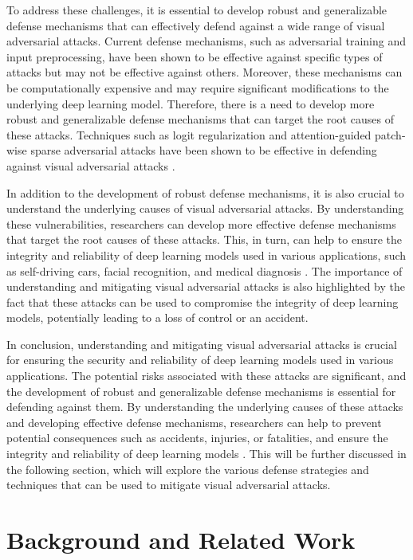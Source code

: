 \documentclass[11pt]{article}
\begin{document}
To address these challenges, it is essential to develop robust and generalizable defense mechanisms that can effectively defend against a wide range of visual adversarial attacks. Current defense mechanisms, such as adversarial training and input preprocessing, have been shown to be effective against specific types of attacks but may not be effective against others. Moreover, these mechanisms can be computationally expensive and may require significant modifications to the underlying deep learning model. Therefore, there is a need to develop more robust and generalizable defense mechanisms that can target the root causes of these attacks. Techniques such as logit regularization and attention-guided patch-wise sparse adversarial attacks have been shown to be effective in defending against visual adversarial attacks \cite{ref15} \cite{ref16}.

In addition to the development of robust defense mechanisms, it is also crucial to understand the underlying causes of visual adversarial attacks. By understanding these vulnerabilities, researchers can develop more effective defense mechanisms that target the root causes of these attacks. This, in turn, can help to ensure the integrity and reliability of deep learning models used in various applications, such as self-driving cars, facial recognition, and medical diagnosis \cite{ref17}. The importance of understanding and mitigating visual adversarial attacks is also highlighted by the fact that these attacks can be used to compromise the integrity of deep learning models, potentially leading to a loss of control or an accident.

In conclusion, understanding and mitigating visual adversarial attacks is crucial for ensuring the security and reliability of deep learning models used in various applications. The potential risks associated with these attacks are significant, and the development of robust and generalizable defense mechanisms is essential for defending against them. By understanding the underlying causes of these attacks and developing effective defense mechanisms, researchers can help to prevent potential consequences such as accidents, injuries, or fatalities, and ensure the integrity and reliability of deep learning models \cite{ref18} \cite{ref19}. This will be further discussed in the following section, which will explore the various defense strategies and techniques that can be used to mitigate visual adversarial attacks.

\section{Background and Related Work}
\end{document}
